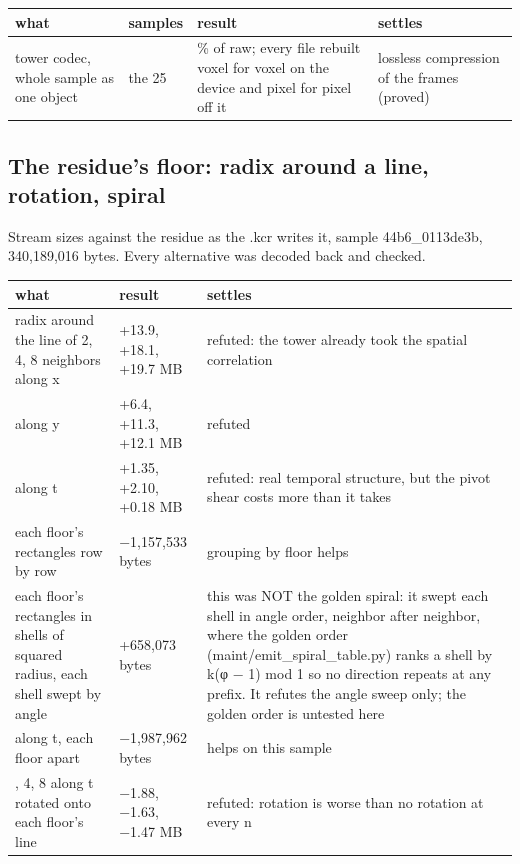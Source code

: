 {\footnotesize
\setlength{\tabcolsep}{6pt}
\begin{longtable}{>{\RaggedRight\arraybackslash}p{}>{\RaggedRight\arraybackslash}p{}>{\RaggedRight\arraybackslash}p{}>{\RaggedRight\arraybackslash}p{}}
\toprule
what & samples & result & settles \\
\midrule
\endhead
tower codec, whole sample as one object & the 25 & 42.0\% of raw; every file rebuilt voxel for voxel on the device and pixel for pixel off it & lossless compression of the frames (proved) \\
\bottomrule
\end{longtable}
}

\subsection{\texorpdfstring{The residue's floor: radix around a line, rotation, spiral}{The residue's floor: radix around a line, rotation, spiral}}

Stream sizes against the residue as the .kcr writes it, sample 44b6\_\allowbreak{}0113de3b, 340,189,016 bytes. Every alternative was decoded back and checked.

{\small
\setlength{\tabcolsep}{6pt}
\begin{longtable}{>{\RaggedRight\arraybackslash}p{}>{\RaggedRight\arraybackslash}p{}>{\RaggedRight\arraybackslash}p{}}
\toprule
what & result & settles \\
\midrule
\endhead
radix around the line of 2, 4, 8 neighbors along x & +13.9, +18.1, +19.7 MB & refuted: the tower already took the spatial correlation \\
along y & +6.4, +11.3, +12.1 MB & refuted \\
along t & +1.35, +2.10, +0.18 MB & refuted: real temporal structure, but the pivot shear costs more than it takes \\
each floor's rectangles row by row & −1,157,533 bytes & grouping by floor helps \\
each floor's rectangles in shells of squared radius, each shell swept by angle & +658,073 bytes & this was NOT the golden spiral: it swept each shell in angle order, neighbor after neighbor, where the golden order (maint/emit\_\allowbreak{}spiral\_\allowbreak{}table.py) ranks a shell by k(φ − 1) mod 1 so no direction repeats at any prefix. It refutes the angle sweep only; the golden order is untested here \\
2 along t, each floor apart & −1,987,962 bytes & helps on this sample \\
2, 4, 8 along t rotated onto each floor's line & −1.88, −1.63, −1.47 MB & refuted: rotation is worse than no rotation at every n \\
\bottomrule
\end{longtable}
}

